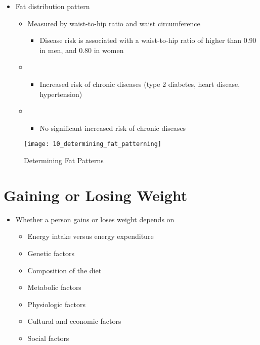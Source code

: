 \documentclass[title={Chapter 10: Achieving and Maintaining a Healthful Body Weight}]{fdsn201notes}
\begin{document}
\begin{itemize}
	\item Fat distribution pattern
	\begin{itemize}
		\item Measured by waist-to-hip ratio and waist circumference
		\begin{itemize}
			\item Disease risk is associated with a waist-to-hip ratio of higher than 0.90 in men, and 0.80 in women
		\end{itemize}
		\item {}
		\begin{itemize}
			\item Increased risk of chronic diseases (type 2 diabetes, heart disease, hypertension)
		\end{itemize}
		\item {}
		\begin{itemize}
			\item No significant increased risk of chronic diseases
		\end{itemize}
	\end{itemize}
\end{itemize}

\begin{figure}[H]
	\centering
	\texttt{[image: 10\_determining\_fat\_patterning]}
	\caption{Determining Fat Patterns}
	\label{fig:determining-fat-patterns}
\end{figure}

\section{Gaining or Losing Weight}\label{sec:gaining-or-losing-weight}
\begin{itemize}
	\item Whether a person gains or loses weight depends on
	\begin{itemize}
		\item Energy intake versus energy expenditure
		\item Genetic factors
		\item Composition of the diet
		\item Metabolic factors
		\item Physiologic factors
		\item Cultural and economic factors
		\item Social factors
	\end{itemize}
\end{itemize}
\end{document}
